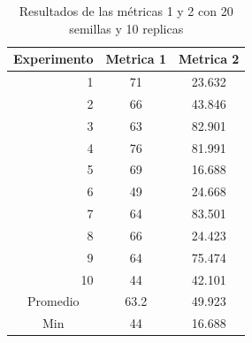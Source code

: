 \documentclass{article}
\begin{document}
\begin{center}

\begin{table}[htbp]
	\centering
	\caption{Resultados  de las métricas 1 y 2 con 20 semillas  y 10 replicas}
	\begin{tabular}{|c|c|c|}
		\hline
		Experimento  & \multicolumn{1}{l|}{Metrica 1} & \multicolumn{1}{p{6.835em}|}{Metrica 2} \\
		\hline
		\multicolumn{1}{|r|}{1} & 71    & 23.632 \\
		\hline
		\multicolumn{1}{|r|}{2} & 66    & 43.846 \\
		\hline
		\multicolumn{1}{|r|}{3} & 63    & 82.901 \\
		\hline
		\multicolumn{1}{|r|}{4} & 76    & 81.991 \\
		\hline
		\multicolumn{1}{|r|}{5} & 69    & \cellcolor[rgb]{ .663,  .816,  .557}16.688 \\
		\hline
		\multicolumn{1}{|r|}{6} & 49    & 24.668 \\
		\hline
		\multicolumn{1}{|r|}{7} & 64    & 83.501 \\
		\hline
		\multicolumn{1}{|r|}{8} & 66    & 24.423 \\
		\hline
		\multicolumn{1}{|r|}{9} & 64    & 75.474 \\
		\hline
		\multicolumn{1}{|r|}{10} & \cellcolor[rgb]{ .663,  .816,  .557}44 & 42.101 \\
		\hline
		Promedio & 63.2  & 49.923 \\
		\hline
		Min   & 44    & 16.688 \\
		\hline
	\end{tabular}%
	\label{tab:cuadro1}%
\end{table}%






\end{center}
\end{document}
